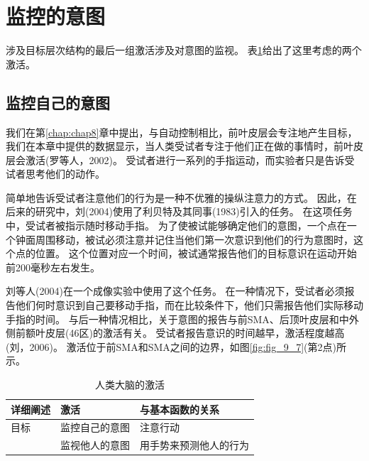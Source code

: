 \section{监控的意图}
\par
涉及目标层次结构的最后一组激活涉及对意图的监视。
表\ref{tab:9_4}给出了这里考虑的两个激活。
\par


\subsection{监控自己的意图}
\par
我们在第\ref{chap:chap8}章中提出，与自动控制相比，前叶皮层会专注地产生目标，我们在本章中提供的数据显示，当人类受试者专注于他们正在做的事情时，前叶皮层会激活(罗等人，2002)。
受试者进行一系列的手指运动，而实验者只是告诉受试者思考他们的动作。
\par


简单地告诉受试者注意他们的行为是一种不优雅的操纵注意力的方式。
因此，在后来的研究中，刘(2004)使用了利贝特及其同事(1983)引入的任务。
在这项任务中，受试者被指示随时移动手指。
为了使被试能够确定他们的意图，一个点在一个钟面周围移动，被试必须注意并记住当他们第一次意识到他们的行为意图时，这个点的位置。
这个位置对应一个时间，被试通常报告他们的目标意识在运动开始前200毫秒左右发生。
\par


刘等人(2004)在一个成像实验中使用了这个任务。
在一种情况下，受试者必须报告他们何时意识到自己要移动手指，而在比较条件下，他们只需报告他们实际移动手指的时间。
与后一种情况相比，关于意图的报告与前SMA、后顶叶皮层和中外侧前额叶皮层(46区)的激活有关。
受试者报告意识的时间越早，激活程度越高(刘，2006)。
激活位于前SMA和SMA之间的边界，如图\ref{fig:fig_9_7}(第2点)所示。
\par


\begin{table}[htbp] 
	\newcommand{\tabincell}[2]{\begin{tabular}{@{}#1@{}}#2\end{tabular}} %
	\centering
	\caption{人类大脑的激活\label{tab:9_4}}
	\renewcommand\arraystretch{1.5}	%
	\begin{tabular}{lll}
		\toprule
		详细阐述 & 激活 & 与基本函数的关系\\
		\midrule
		目标 & 监控自己的意图 & 注意行动  \\
		& 监视他人的意图 & 用手势来预测他人的行为 \\
		\bottomrule
		
	\end{tabular}%
\end{table}%


